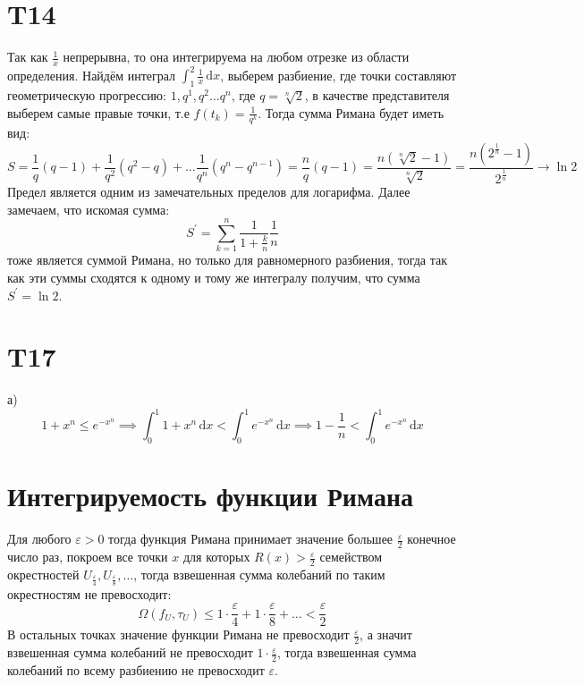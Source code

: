 \documentclass[12pt]{article}
\begin{document}
\section{T14}
Так как $\frac{1}{x}$ непрерывна, то она интегрируема на любом отрезке из области определения.
Найдём интеграл $\int_{1}^{2} \frac{1}{x} \,\mathrm{d}x$, выберем разбиение, где точки
составляют геометрическую прогрессию: $1, q^1, q^2 \dots q^n$, где $q = \sqrt[n]{2}$,
в качестве представителя выберем самые правые точки, т.е $f(t_k) = \frac{1}{q^k}$.
Тогда сумма Римана будет иметь вид:
\[
    S = \frac{1}{q}(q - 1) + \frac{1}{q^2}(q^2 - q) + \dots \frac{1}{q^n}(q^n - q^{n-1}) =
    \frac{n}{q}(q - 1) = \frac{n(\sqrt[n]{2} - 1)}{\sqrt[n]{2}} = \frac{n( 2^{\frac{1}{n}} - 1) }{2^{\frac{1}{n}}} \to \ln 2
\]
Предел является одним из замечательных пределов для логарифма. Далее замечаем, что искомая сумма:
\[
    S^{\prime}  = \sum_{k=1}^{n} \frac{1}{1 + \frac{k}{n}} \frac{1}{n}
\]
тоже является суммой Римана, но только для равномерного разбиения, тогда так как эти суммы сходятся к одному и тому же
интегралу получим, что сумма $S^{\prime} = \ln 2$.
\section{T17}
а)
\[
    1 + x^n \leq e^{-x^n} \implies \int_{0}^{1} 1 + x^n \,\mathrm{d}x  < \int_{0}^{1} e^{-x^n} \,\mathrm{d}x  \implies 1 - \frac{1}{n} < \int_{0}^{1} e^{-x^n} \,\mathrm{d}x
\]
\section{Интегрируемость функции Римана}
Для любого $\varepsilon > 0$ тогда функция Римана принимает значение большее $\frac{\varepsilon}{2}$ конечное число раз,
покроем все точки $x$ для которых $R(x) > \frac{\varepsilon}{2}$ семейством окрестностей $U_{\frac{\varepsilon}{4}}, U_{\frac{\varepsilon}{8}}, \dots$,
тогда взвешенная сумма колебаний по таким окрестностям не превосходит:
\[
    \Omega(f_U, \tau_U) \leq 1\cdot\frac{\varepsilon}{4} + 1\cdot\frac{\varepsilon}{8} + \dots < \frac{\varepsilon}{2}
\]
В остальных точках значение функции Римана не превосходит $\frac{\varepsilon}{2}$, а значит взвешенная сумма колебаний
не превосходит $1\cdot\frac{\varepsilon}{2}$, тогда взвешенная сумма колебаний по всему разбиению не превосходит $\varepsilon$.
\end{document}
